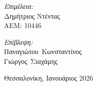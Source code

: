 \documentclass[a4paper,12 pt,oneside]{report}
\begin{document}
\begin{titlepage}
\begin{center}
		\begin{minipage}[t][4cm][t]{0.45\textwidth}
			\raggedright
			\large
			\emph{Επιμέλεια:} \\
			Δημήτριος Ντέντας \\
			ΑΕΜ: 10446
		\end{minipage}%
		\hfill
		\begin{minipage}[t][4cm][t]{0.45\textwidth}
			\raggedleft
			\large
			\textit{Επίβλεψη:} \\
			Παναγιώτου~Κωνσταντίνος \\
			Γιώργος~Σιαχάμης
		\end{minipage}

		\vspace{2cm}

		\begin{center}
			{\large Θεσσαλονίκη, Ιανουάριος 2026}
		\end{center}
	\end{center}
\end{titlepage}



\sloppy

\tableofcontents

\newevenside
{}















\newevenside
\renewcommand{\bibname}{Βιβλιογραφία}

\end{document}
